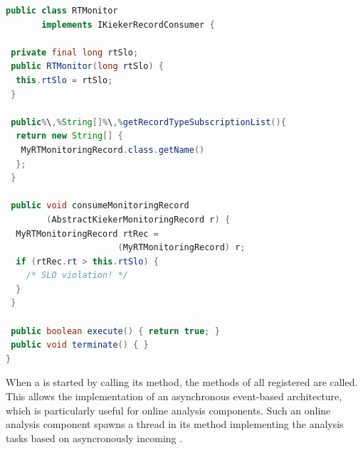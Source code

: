 \begin{lstlisting}[float,language=Java, caption=Example response time monitor, label=lst:rtMonitor,escapechar=\%]
public class RTMonitor
       implements IKiekerRecordConsumer {

 private final long rtSlo;
 public RTMonitor(long rtSlo) {
  this.rtSlo = rtSlo;
 }

 public%\,%String[]%\,%getRecordTypeSubscriptionList(){
  return new String[] {
   MyRTMonitoringRecord.class.getName()
  };
 }

 public void consumeMonitoringRecord
        (AbstractKiekerMonitoringRecord r) {
  MyRTMonitoringRecord rtRec =
                      (MyRTMonitoringRecord) r;
  if (rtRec.rt > this.rtSlo) {
    /* SLO violation! */
  }
 }

 public boolean execute() { return true; }
 public void terminate() { }
}
\end{lstlisting}

When a \TpanInstance{} is started by calling its  method, the
 methods of all registered \MonitoringRecordConsumers{} %
are called. %
This allows the implementation of an asynchronous event-based architecture,
which is particularly useful for online analysis components. %
Such an online analysis component spawns a thread in its  %
method implementing the analysis tasks based on asyncronously incoming \MonitoringRecords{}. %
